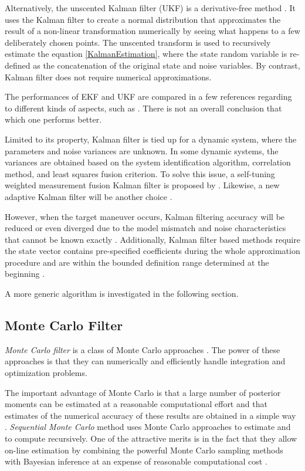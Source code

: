 Alternatively, the unscented Kalman filter (UKF) is a derivative-free method \citep{julier1997new, wan2000unscented, gyorgy2014unscented}. It uses the Kalman filter to create a normal distribution that approximates the result of a non-linear transformation numerically by seeing what happens to a few deliberately chosen points. The unscented transform is used to recursively estimate the equation \eqref{KalmanEstimation}, where the state random variable is re-defined as the concatenation of the original state and noise variables. By contrast, Kalman filter does not require numerical approximations. 

The performances of EKF and UKF are compared in a few references regarding to different kinds of aspects, such as \citep{chandrasekar2007comparison, laviola2003comparison, st2004comparison}. There is not an overall conclusion that which one performs better. 


Limited to its property, Kalman filter is tied up for a dynamic system, where the parameters and noise variances are unknown. In some dynamic systems, the variances are obtained based on the system identification algorithm, correlation method, and least squares fusion criterion. To solve this issue, a self-tuning weighted measurement fusion Kalman filter is proposed by \cite{ran2010self}. Likewise, a new adaptive Kalman filter will be another choice \citep{oussalah2001adaptive}. 


However, when the target maneuver occurs, Kalman filtering accuracy will be reduced or even diverged due to the model mismatch and noise characteristics that cannot be known exactly \citep{liu2014filtering}. Additionally, Kalman filter based methods require the state vector contains pre-specified coefficients during the whole approximation procedure and are within the bounded definition range determined at the beginning \citep{jauch2017recursive}. 

A more generic algorithm is investigated in the following section. 

\subsection*{Monte Carlo Filter}

\textit{Monte Carlo filter} is a class of Monte Carlo approaches \citep{chen2003bayesian}. The power of these approaches is that they can numerically and efficiently handle integration and optimization problems. 

The important advantage of Monte Carlo is that a large number of posterior moments can be estimated at a reasonable computational effort and that estimates of the numerical accuracy of these results are obtained in a simple way \citep{kloek1978bayesian}. \textit{Sequential Monte Carlo} method uses Monte Carlo approaches to estimate and to compute recursively. One of the attractive merits is in the fact that they allow on-line estimation by combining the powerful Monte Carlo sampling methods with Bayesian inference at an expense of reasonable computational cost \citep{chen2003bayesian}. 

